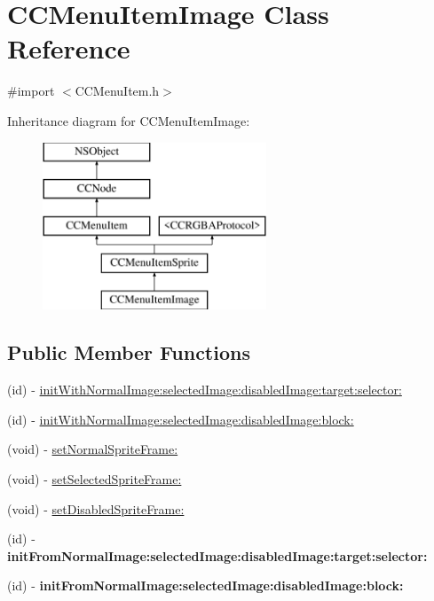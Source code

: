 \hypertarget{class_c_c_menu_item_image}{\section{C\-C\-Menu\-Item\-Image Class Reference}
\label{class_c_c_menu_item_image}
}


{\ttfamily \#import $<$C\-C\-Menu\-Item.\-h$>$}

Inheritance diagram for C\-C\-Menu\-Item\-Image\-:\begin{figure}[H]
\begin{center}
\leavevmode
\includegraphics[height=5.000000cm]{class_c_c_menu_item_image}
\end{center}
\end{figure}
\subsection*{Public Member Functions}
\begin{DoxyCompactItemize}
\item 
(id) -\/ \hyperlink{class_c_c_menu_item_image_a2a4d484b61f70c9eb30c524c2ecfd396}{init\-With\-Normal\-Image\-:selected\-Image\-:disabled\-Image\-:target\-:selector\-:}
\item 
(id) -\/ \hyperlink{class_c_c_menu_item_image_a11d9d86bde8c62c102307ad7f69af046}{init\-With\-Normal\-Image\-:selected\-Image\-:disabled\-Image\-:block\-:}
\item 
(void) -\/ \hyperlink{class_c_c_menu_item_image_af2a4fce2af11aedecbb4f577dfc68800}{set\-Normal\-Sprite\-Frame\-:}
\item 
(void) -\/ \hyperlink{class_c_c_menu_item_image_a4c83978f3e8027aa1c0a207e832af739}{set\-Selected\-Sprite\-Frame\-:}
\item 
(void) -\/ \hyperlink{class_c_c_menu_item_image_adc63c52598174fe17acffd3b6a862c56}{set\-Disabled\-Sprite\-Frame\-:}
\item 
\hypertarget{class_c_c_menu_item_image_adb214f0f7684c65d1e54a66a8dcfb7fe}{(id) -\/ {\bfseries init\-From\-Normal\-Image\-:selected\-Image\-:disabled\-Image\-:target\-:selector\-:}}\label{class_c_c_menu_item_image_adb214f0f7684c65d1e54a66a8dcfb7fe}

\item 
\hypertarget{class_c_c_menu_item_image_a3c4937396131d34acf52bf6d5342ae9c}{(id) -\/ {\bfseries init\-From\-Normal\-Image\-:selected\-Image\-:disabled\-Image\-:block\-:}}\label{class_c_c_menu_item_image_a3c4937396131d34acf52bf6d5342ae9c}

\end{DoxyCompactItemize}
